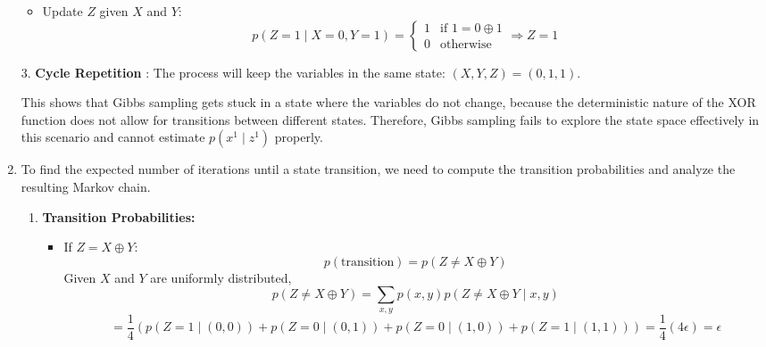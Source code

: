 \documentclass[a4 paper]{article}
\begin{document}
\begin{enumerate}
\begin{itemize}
        \item Update \( Z \) given \( X \) and \( Y \):
            \[
            p(Z = 1 \mid X = 0, Y = 1) = 
            \begin{cases} 
            1 & \text{if } 1 = 0 \oplus 1 \\
            0 & \text{otherwise}
            \end{cases} \Rightarrow Z = 1
            \]
    \end{itemize}


    3. \textbf{Cycle Repetition} : The process will keep the variables in the same state: \( (X, Y, Z) = (0, 1, 1) \).

    This shows that Gibbs sampling gets stuck in a state where the variables do not change, because the deterministic nature of the XOR function does not allow for transitions between different states. Therefore, Gibbs sampling fails to explore the state space effectively in this scenario and cannot estimate \( p(x^1 \mid z^1) \) properly.

    \newpage
    \item {}
    

    To find the expected number of iterations until a state transition, we need to compute the transition probabilities and analyze the resulting Markov chain.

    \begin{enumerate}
        \item \textbf{Transition Probabilities:}
        \begin{itemize}
            \item If \( Z = X \oplus Y \):
            \[
            p(\text{transition}) = p(Z \ne X \oplus Y) 
            \]
            Given \( X \) and \( Y \) are uniformly distributed,
            \[
            p(Z \ne X \oplus Y) = \sum_{x,y} p(x, y) p(Z \ne X \oplus Y \mid x, y)
            \]
            \[
            = \frac{1}{4} \left( p(Z = 1 \mid (0, 0)) + p(Z = 0 \mid (0, 1)) + p(Z = 0 \mid (1, 0)) + p(Z = 1 \mid (1, 1)) \right) = \frac{1}{4} (4\epsilon) = \epsilon
            \]
    

\end{itemize}
\end{enumerate}
\end{enumerate}
\end{document}
